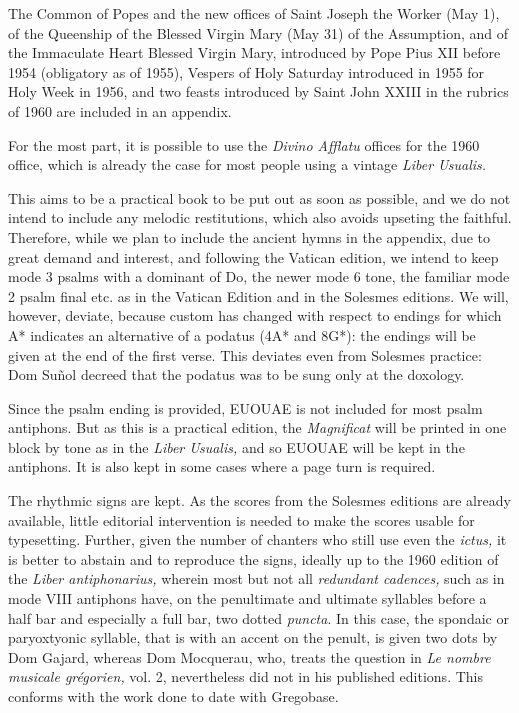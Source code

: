 \begin{enpars}
The Common of Popes and the new offices of Saint Joseph the Worker (May 1), of the Queenship of the Blessed Virgin Mary (May 31) of the Assumption, and of the Immaculate Heart Blessed Virgin Mary, introduced by Pope Pius XII before 1954 (obligatory as of 1955), Vespers of Holy Saturday introduced in 1955 for Holy Week in 1956, and two feasts introduced by Saint John XXIII in the rubrics of 1960 are included in an appendix.

For the most part, it is possible to use the \textit{Divino Afflatu} offices for the 1960 office, which is already the case for most people using a vintage \textit{Liber Usualis.}

This aims to be a practical book to be put out as soon as possible, and we do not intend to include any melodic restitutions, which also avoids upseting the faithful. Therefore, while we plan to include the ancient hymns in the appendix, due to great demand and interest, and following the Vatican edition, we intend to keep mode 3 psalms with a dominant of Do, the newer mode 6 tone, the familiar mode 2 psalm final etc. as in the Vatican Edition and in the Solesmes editions. We will, however, deviate, because custom has changed with respect to endings for which A* indicates an alternative of a podatus (4A* and 8G*): the endings will be given at the end of the first verse. This deviates even from Solesmes practice: Dom Suñol decreed that the podatus was to be sung only at the doxology.

Since the psalm ending is provided, EUOUAE is not included for most psalm antiphons. But as this is a practical edition, the \textit{Magnificat} will be printed in one block by tone as in the \textit{Liber Usualis,} and so EUOUAE will be kept in the antiphons. It is also kept in some cases where a page turn is required.

The rhythmic signs are kept. As the scores from the Solesmes editions are already available, little editorial intervention is needed to make the scores usable for typesetting. Further, given the number of chanters who still use even the \textit{ictus,}  it is better to abstain and to reproduce the signs, ideally up to the 1960 edition of the \textit{Liber antiphonarius,} wherein most but not all \textit{redundant cadences,} such as in mode VIII antiphons have, on the penultimate and ultimate syllables before a half bar and especially a full bar, two dotted \textit{puncta}. In this case, the spondaic or paryoxtyonic syllable, that is with an accent on the penult, is given two dots by Dom Gajard, whereas Dom Mocquerau, who, treats the question in \textit{Le nombre musicale grégorien,} vol. 2, nevertheless did not in his published editions. This conforms with the work done to date with Gregobase.


\end{enpars}
